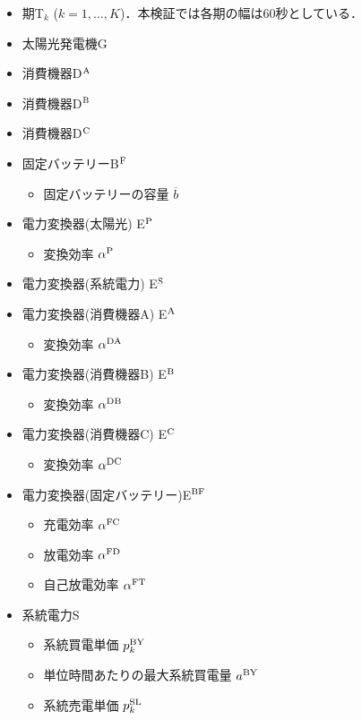 \documentclass{jarticle}
\newcommand{\IB}{$\bullet$}
\newcommand{\IS}{$*$}
\begin{document}
\begin{itemize}
 \item[\IS] 期T$_k$ ($k=1,\ldots,K$)．本検証では各期の幅は$60$秒としている．
 \item[\IS] 太陽光発電機G
 \item[\IS] 消費機器D$^{\rm A}$
 \item[\IS] 消費機器D$^{\rm B}$
 \item[\IS] 消費機器D$^{\rm C}$
 \item[\IS] 固定バッテリーB$^{\rm F}$
  \begin{itemize}
   \item[\IB] 固定バッテリーの容量 $\overline{b}$
  \end{itemize}
 \item[\IS] 電力変換器(太陽光) E$^{\rm P}$
  \begin{itemize}
   \item[\IB] 変換効率 $\alpha^{\rm P}$
  \end{itemize}
 \item[\IS] 電力変換器(系統電力) E$^{\rm S}$
 \item[\IS] 電力変換器(消費機器A) E$^{\rm A}$
  \begin{itemize}
   \item[\IB] 変換効率 $\alpha^{\rm DA}$
  \end{itemize}
 \item[\IS] 電力変換器(消費機器B) E$^{\rm B}$
  \begin{itemize}
   \item[\IB] 変換効率 $\alpha^{\rm DB}$
  \end{itemize}
 \item[\IS] 電力変換器(消費機器C) E$^{\rm C}$
  \begin{itemize}
   \item[\IB] 変換効率 $\alpha^{\rm DC}$
  \end{itemize}
 \item[\IS] 電力変換器(固定バッテリー)E$^{\rm BF}$
  \begin{itemize}
   \item[\IB] 充電効率 $\alpha^{\rm FC}$
   \item[\IB] 放電効率 $\alpha^{\rm FD}$
   \item[\IB] 自己放電効率 $\alpha^{\rm FT}$
  \end{itemize}
 \item[\IS] 系統電力S
  \begin{itemize}
   \item[\IB] 系統買電単価 $p^{\rm BY}_{k}$
   \item[\IB] 単位時間あたりの最大系統買電量 $a^{\rm BY}$
   \item[\IB] 系統売電単価 $p^{\rm SL}_{k}$
 \end{itemize}
\end{itemize}
\end{document}
